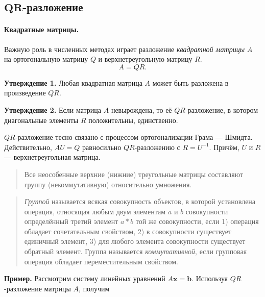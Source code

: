\documentclass[11pt,a4paper]{article}
\begin{document}
    \hypertarget{mathbfqr-ux440ux430ux437ux43bux43eux436ux435ux43dux438ux435}{%
\subsection{\texorpdfstring{\(\mathbf{QR}\)-разложение}{QR-разложение}}\label{mathbfqr-ux440ux430ux437ux43bux43eux436ux435ux43dux438ux435}}

\hypertarget{ux43aux432ux430ux434ux440ux430ux442ux43dux44bux435-ux43cux430ux442ux440ux438ux446ux44b}{%
\paragraph{Квадратные матрицы.} \label{ux43aux432ux430ux434ux440ux430ux442ux43dux44bux435-ux43cux430ux442ux440ux438ux446ux44b}}

Важную роль в численных методах играет разложение \emph{квадратной
матрицы} \(A\) на ортогональную матрицу \(Q\) и верхнетреугольную
матрицу \(R\). \[
  A = QR.
\]

\textbf{Утверждение 1.} Любая квадратная матрица \(A\) может быть
разложена в произведение \(QR\).

\textbf{Утверждение 2.} Если матрица \(A\) невырождена, то её
\(QR\)-разложение, в котором диагональные элементы \(R\) положительны,
единственно.

\(QR\)-разложение тесно связано с процессом ортогонализации Грама ---
Шмидта. Действительно, \(AU = Q\) равносильно \(QR\)-разложению с
\(R = U^{-1}\). Причём, \(U\) и \(R\) --- верхнетреугольная матрица.

\begin{quote}
Все неособенные верхние (нижние) треугольные матрицы составляют группу
(некоммутативную) относительно умножения.
\end{quote}

\begin{quote}
\emph{Группой} называется всякая совокупность объектов, в которой
установлена операция, относящая любым двум элементам \(a\) и \(b\)
совокупности определённый третий элемент \(a \ast b\) той же
совокупности, если 1) операция обладает сочетательным свойством, 2) в
совокупности существует единичный элемент, 3) для любого элемента
совокупности существует обратный элемент. Группа называется
\emph{коммутативной}, если групповая операция обладает переместительным
свойством.
\end{quote}

\textbf{Пример.} Рассмотрим систему линейных уравнений
\(A\mathbf{x} = \mathbf{b}\). Используя \(QR\)-разложение матрицы \(A\),
получим
\end{document}

